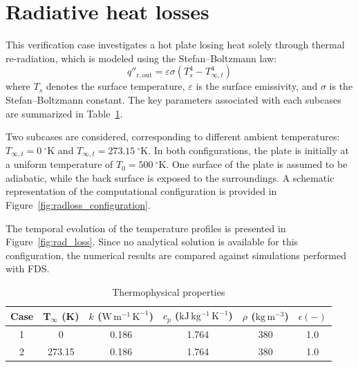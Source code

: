 \documentclass[12pt]{article}
\begin{document}
\fi

\section{Radiative heat losses}


This verification case investigates a hot plate losing heat solely through thermal re-radiation, which is modeled using the Stefan--Boltzmann law:
\begin{equation}
q''_{\mathrm{r,out}} = \varepsilon \sigma \left( T_s^4 - T_{\infty,t}^4 \right)
\end{equation}
where $T_s$ denotes the surface temperature, $\varepsilon$ is the surface emissivity, and $\sigma$ is the Stefan--Boltzmann constant. The key parameters associated with each subcases are summarized in Table~\ref{tab:phys_props_radloss}.

Two subcases are considered, corresponding to different ambient temperatures: $T_{\infty,t} = 0~^\circ\mathrm{K}$ and $T_{\infty,t} = 273.15~^\circ\mathrm{K}$. In both configurations, the plate is initially at a uniform temperature of $T_0 = 500~^\circ\mathrm{K}$. One surface of the plate is assumed to be adiabatic, while the back surface is exposed to the surroundings. A schematic representation of the computational configuration is provided in Figure~\ref{fig:radloss_configuration}.

The temporal evolution of the temperature profiles is presented in Figure~\ref{fig:rad_loss}. Since no analytical solution is available for this configuration, the numerical results are compared against simulations performed with \textsc{FDS}.

\vspace{-0.5cm}


\begin{table}[H]
\centering
\caption{Thermophysical properties}
\label{tab:phys_props_radloss}
\renewcommand{\arraystretch}{1.3} %
\begin{tabular}{c c c c c c}
\hline
Case &
T$_\infty$ (K) &
$k$ ($\mathrm{W\,m^{-1}\,K^{-1}}$) & 
$c_p$ ($\mathrm{kJ\,kg^{-1}\,K^{-1}}$) & 
$\rho$ ($\mathrm{kg\,m^{-3}}$) & 
$\epsilon (-)$ \\
\hline
1 & 0 & 0.186 & 1.764 & 380 & 1.0 \\
\hline
2 & 273.15 & 0.186 & 1.764 & 380 & 1.0 \\
\hline
\end{tabular}
\end{table}
\vspace{-0.5cm}
\end{document}
